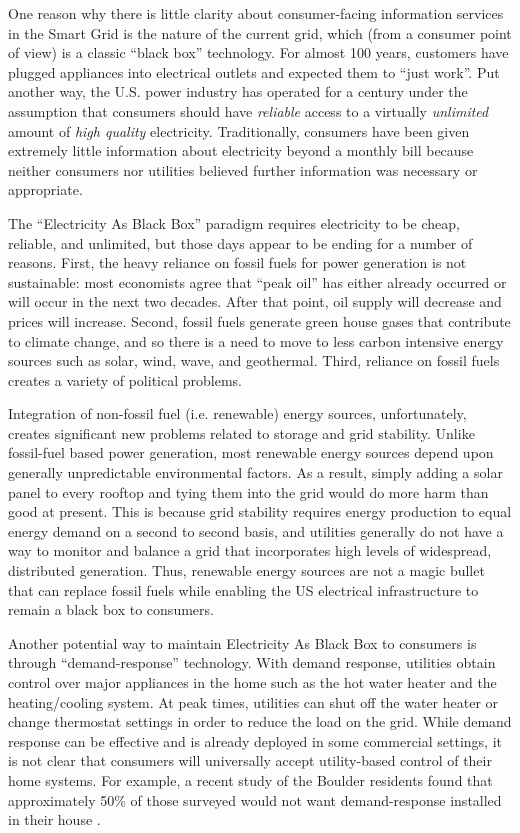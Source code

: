 One reason why there is little clarity about consumer-facing information
services in the Smart Grid is the nature of the current grid, which (from a
consumer point of view) is a classic ``black box'' technology.  For almost
100 years, customers have plugged appliances into electrical outlets and
expected them to ``just work''.  Put another way, the U.S. power industry
has operated for a century under the assumption that consumers should have
{\em reliable} access to a virtually {\em unlimited} amount of {\em high
  quality} electricity.  Traditionally, consumers have been given extremely
little information about electricity beyond a monthly bill because neither
consumers nor utilities believed further information was necessary or
appropriate.

The ``Electricity As Black Box'' paradigm requires electricity to be cheap,
reliable, and unlimited, but those days appear to be ending for a number of
reasons.  First, the heavy reliance on fossil fuels for power generation is
not sustainable: most economists agree that ``peak oil'' has either already
occurred or will occur in the next two decades. After that point, oil
supply will decrease and prices will increase.  Second, fossil fuels
generate green house gases that contribute to climate change, and so there
is a need to move to less carbon intensive energy sources such as solar,
wind, wave, and geothermal.  Third, reliance on fossil fuels creates a
variety of political problems.

Integration of non-fossil fuel (i.e. renewable) energy sources, unfortunately,
creates significant new problems related to storage and grid stability.
Unlike fossil-fuel based power generation, most renewable energy sources
depend upon generally unpredictable environmental
factors.  As a result, simply adding a solar panel to every rooftop and
tying them into the grid would do more harm than good at present.
This is because grid stability requires energy production to equal energy demand
on a second to second basis, and utilities generally do not have a way to
monitor and balance a grid that incorporates high levels of widespread,
distributed generation. Thus, renewable energy sources are not a magic
bullet that can replace fossil fuels while enabling the US electrical
infrastructure to remain a black box to consumers.

Another potential way to maintain Electricity As Black Box to
consumers is through ``demand-response'' technology.  With demand response,
utilities obtain control over major appliances in the home such as the hot
water heater and the heating/cooling system. At peak times, utilities can
shut off the water heater or change thermostat settings in order to reduce
the load on the grid.  While demand response can be effective and is
already deployed in some commercial settings, it is not clear that
consumers will universally accept utility-based control of their home
systems.  For example, a recent study of the Boulder residents found that
approximately 50\% of those surveyed would not want demand-response
installed in their house \cite{Farhar09}.

